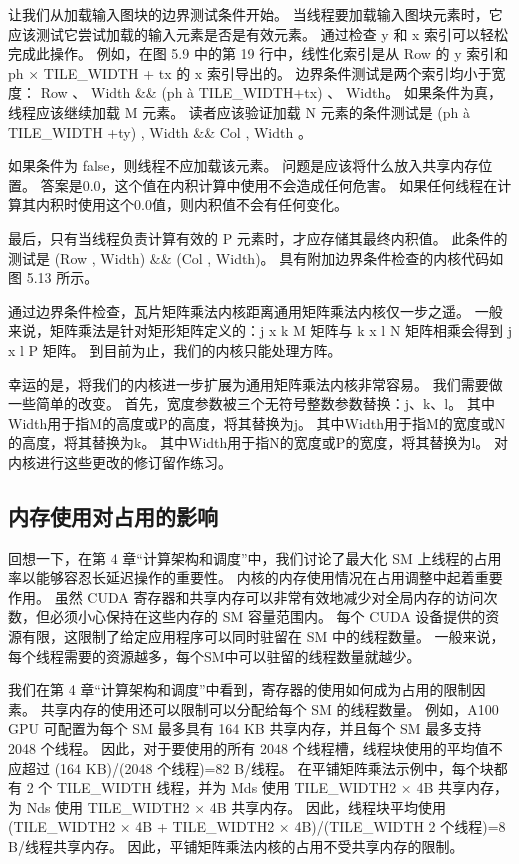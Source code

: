 让我们从加载输入图块的边界测试条件开始。 当线程要加载输入图块元素时，它应该测试它尝试加载的输入元素是否是有效元素。 通过检查 y 和 x 索引可以轻松完成此操作。 例如，在图 5.9 中的第 19 行中，线性化索引是从 Row 的 y 索引和 ph × TILE\_WIDTH + tx 的 x 索引导出的。 边界条件测试是两个索引均小于宽度： Row 、 Width \&\& (ph à TILE\_WIDTH+tx) 、 Width。 如果条件为真，线程应该继续加载 M 元素。 读者应该验证加载 N 元素的条件测试是 (ph à TILE\_WIDTH +ty) , Width \&\& Col , Width 。

如果条件为 false，则线程不应加载该元素。 问题是应该将什么放入共享内存位置。 答案是0.0，这个值在内积计算中使用不会造成任何危害。 如果任何线程在计算其内积时使用这个0.0值，则内积值不会有任何变化。

最后，只有当线程负责计算有效的 P 元素时，才应存储其最终内积值。 此条件的测试是 (Row , Width) \&\& (Col , Width)。 具有附加边界条件检查的内核代码如图 5.13 所示。

通过边界条件检查，瓦片矩阵乘法内核距离通用矩阵乘法内核仅一步之遥。 一般来说，矩阵乘法是针对矩形矩阵定义的：j x k M 矩阵与 k x l N 矩阵相乘会得到 j x l P 矩阵。 到目前为止，我们的内核只能处理方阵。

幸运的是，将我们的内核进一步扩展为通用矩阵乘法内核非常容易。 我们需要做一些简单的改变。 首先，宽度参数被三个无符号整数参数替换：j、k、l。 其中Width用于指M的高度或P的高度，将其替换为j。 其中Width用于指M的宽度或N的高度，将其替换为k。 其中Width用于指N的宽度或P的宽度，将其替换为l。 对内核进行这些更改的修订留作练习。

\subsection{内存使用对占用的影响}
回想一下，在第 4 章“计算架构和调度”中，我们讨论了最大化 SM 上线程的占用率以能够容忍长延迟操作的重要性。 内核的内存使用情况在占用调整中起着重要作用。 虽然 CUDA 寄存器和共享内存可以非常有效地减少对全局内存的访问次数，但必须小心保持在这些内存的 SM 容量范围内。 每个 CUDA 设备提供的资源有限，这限制了给定应用程序可以同时驻留在 SM 中的线程数量。 一般来说，每个线程需要的资源越多，每个SM中可以驻留的线程数量就越少。

我们在第 4 章“计算架构和调度”中看到，寄存器的使用如何成为占用的限制因素。 共享内存的使用还可以限制可以分配给每个 SM 的线程数量。 例如，A100 GPU 可配置为每个 SM 最多具有 164 KB 共享内存，并且每个 SM 最多支持 2048 个线程。 因此，对于要使用的所有 2048 个线程槽，线程块使用的平均值不应超过 (164 KB)/(2048 个线程)=82 B/线程。 在平铺矩阵乘法示例中，每个块都有 2 个 TILE\_WIDTH 线程，并为 Mds 使用 TILE\_WIDTH2 × 4B 共享内存，为 Nds 使用 TILE\_WIDTH2 × 4B 共享内存。 因此，线程块平均使用 (TILE\_WIDTH2 × 4B + TILE\_WIDTH2 × 4B)/(TILE\_WIDTH 2 个线程)=8 B/线程共享内存。 因此，平铺矩阵乘法内核的占用不受共享内存的限制。

